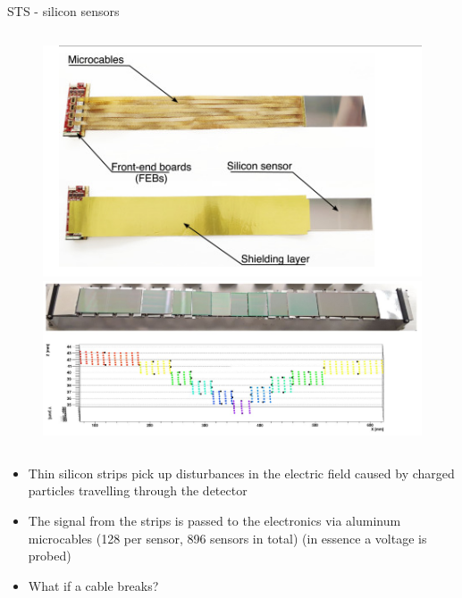 \begin{columnframe}{STS - silicon sensors}
    \begin{column}{0.5\textwidth}
        \begin{figure}
            \centering
            \includegraphics[width=\textwidth, frame]{images/sts_silicon_sensor.png}
            \includegraphics[width=\textwidth]{images/sts_strips.png}
        \end{figure}
    \end{column}
    \begin{column}{0.5\textwidth}
        \begin{itemize}
            \item Thin silicon strips pick up disturbances in the electric field
                  caused by charged particles travelling through the detector
            \item The signal from the strips is passed to the electronics via aluminum
                  microcables (128 per sensor, 896 sensors in total)
                  (in essence a voltage is probed)
            \item What if a cable breaks?
        \end{itemize}
    \end{column}
\end{columnframe}
